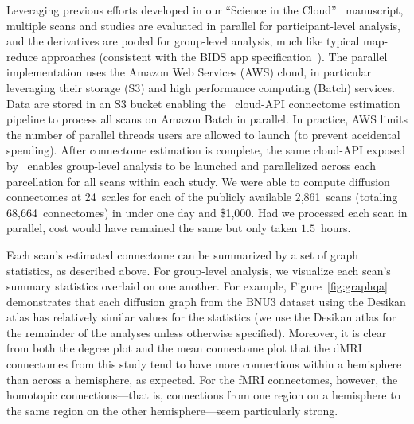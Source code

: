 \documentclass[11pt]{article}
\begin{document}
Leveraging previous efforts developed in our  ``Science in the Cloud''~\cite{sic} manuscript, multiple scans and studies are evaluated in parallel for participant-level analysis, and the derivatives are pooled for group-level analysis, much like typical map-reduce approaches (consistent with the BIDS app specification~\cite{bidsapps}). The parallel  implementation uses the Amazon Web Services (AWS) cloud, in particular leveraging their storage (S3) and high performance computing (Batch) services. Data are stored in an S3 bucket enabling  the \ndmg~cloud-API connectome estimation pipeline to process all scans on Amazon Batch in parallel. In practice,  AWS limits the number of parallel threads users are allowed to launch (to prevent accidental spending). After connectome estimation is complete, the same cloud-API exposed by \ndmg~enables group-level analysis to be launched and parallelized across each parcellation for all scans within each study. We were able to compute diffusion connectomes at 24~scales for each of the publicly available 2,861~scans (totaling 68,664~connectomes) in under one day and \$1,000. Had we processed each scan in parallel, cost would have remained the same but only taken $1.5$~hours.


Each scan's estimated connectome can be summarized by a set of graph statistics, as described above. For group-level analysis, we visualize each scan's summary statistics overlaid on one another. For example, Figure~\ref{fig:graphqa} demonstrates that each diffusion graph from the BNU3 dataset using the Desikan atlas has relatively similar values for the statistics (we use the Desikan atlas for the remainder of the analyses unless otherwise specified). Moreover, it is clear from both the degree plot and the mean connectome plot that the dMRI connectomes from this study tend to have more connections within a hemisphere than across a hemisphere, as expected. For the fMRI connectomes, however, the homotopic connections---that is, connections from one region on a hemisphere to the same region on the other hemisphere---seem particularly strong.
 
\end{document}
